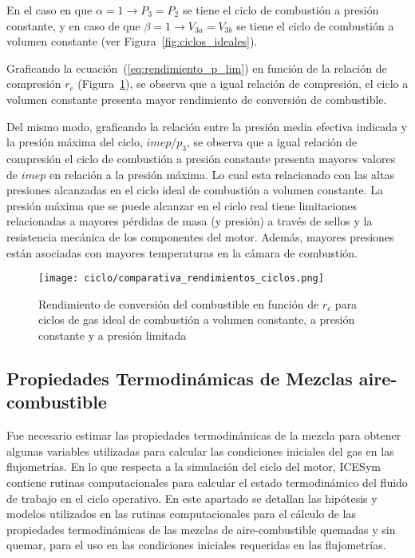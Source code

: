 En el caso en que  $\alpha=1 \rightarrow P_3=P_2$ se tiene el ciclo de
combustión a presión constante, y en caso de que
$\beta=1 \rightarrow V_{3a}=V_{3b}$ se tiene el ciclo de combustión a volumen
constante (ver Figura~\ref{fig:ciclos_ideales}).

Graficando la ecuación~(\ref{eq:rendimiento_p_lim}) en función de la relación de
compresión $r_c$ (Figura~\ref{fig:rendimientos}), se observa que a igual
relación de compresión, el ciclo a volumen constante presenta mayor rendimiento
de conversión de combustible.

Del mismo modo, graficando la relación entre la presión media efectiva indicada
y la presión máxima del ciclo, $imep/p_3$, se observa que a igual relación de
compresión el ciclo de combustión a presión constante presenta mayores valores
de $imep$ en relación a la presión máxima.
%
Lo cual esta relacionado con las altas presiones alcanzadas en el ciclo ideal de
combustión a volumen constante.
%
La presión máxima que se puede alcanzar en el ciclo real tiene limitaciones
relacionadas a mayores pérdidas de masa (y presión) a través de sellos y la
resistencia mecánica de los componentes del motor.
%
Además, mayores presiones están asociadas con mayores temperaturas en la cámara
de combustión.

\begin{figure} \centering
\texttt{[image: ciclo/comparativa\_rendimientos\_ciclos.png]}
    \caption{Rendimiento de conversión del combustible en función de $r_c$ para
ciclos de gas ideal de combustión a volumen constante, a presión constante y a
presión limitada~\parencite{heywood}} \label{fig:rendimientos}
\end{figure}


\subsection{Propiedades Termodinámicas de Mezclas aire-combustible}\label{subsec:prop_mezcla}
%
Fue necesario estimar las propiedades termodinámicas de la mezcla para obtener
algunas variables utilizadas para calcular las condiciones iniciales del gas en
las flujometrías.
%
En lo que respecta a la simulación del ciclo del motor, ICESym contiene rutinas
computacionales para calcular el estado termodinámico del fluido de trabajo en
el ciclo operativo.
%
En este apartado se detallan las hipótesis y modelos utilizados en las rutinas
computacionales para el cálculo de las propiedades termodinámicas de las mezclas
de aire-combustible quemadas y sin quemar, para el uso en las condiciones
iniciales requeridas en las flujometrías.

